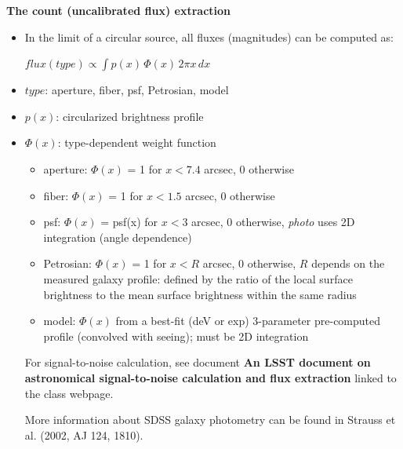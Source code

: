 \documentclass[letterpaper,landscape]{slides}
\begin{document}


\begin{slide}
\begin{center}
\bfseries
{\large {\color{red} The count (uncalibrated flux) extraction}}
\end{center}
\vskip 0.6in

\begin{itemize}
\item {\color{blue} In the limit of a circular source, all fluxes (magnitudes) 
can be computed as:}

         $flux(type) \propto \int p(x) \, \Phi(x) \, 2\pi x \,dx$ 

\item {\color{blue} $type$:} aperture, fiber, psf, Petrosian, model
\item {\color{blue} $p(x)$:} circularized brightness profile
\item {\color{blue} $\Phi(x)$:} type-dependent weight function
\begin{itemize}
   \item {\color{red} aperture:} $\Phi(x)$ = 1 for $x<7.4$ arcsec, 0 otherwise
   \item {\color{red} fiber:} $\Phi(x)$ = 1 for $x<1.5$ arcsec, 0 otherwise
   \item {\color{red} psf:} $\Phi(x)$ = psf(x) for $x<3$ arcsec, 0 otherwise, 
               {\it photo} uses 2D integration (angle dependence)
   \item {\color{red} Petrosian:} $\Phi(x)$ = 1 for $x<R$ arcsec, 0 otherwise,
      $R$ depends on the measured galaxy profile: defined by the 
      ratio of the local surface brightness to the mean surface
      brightness within the same radius  
   \item {\color{red} model:} $\Phi(x)$ from a best-fit (deV or exp) 3-parameter 
     pre-computed profile (convolved with seeing); must be 2D integration
\end{itemize}

For {\color{red} signal-to-noise calculation}, see document {\bf An LSST document on astronomical 
signal-to-noise calculation and flux extraction} linked to the class webpage. 

More information about {\color{red} SDSS galaxy photometry} can be found in Strauss et al. (2002, AJ 124, 1810). 

\end{itemize} 

\end{slide}
 
\end{document}
